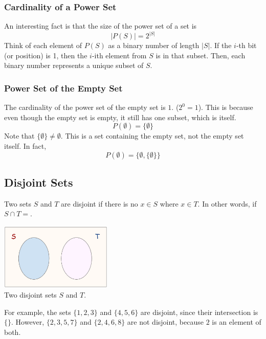\documentclass[10pt]{article}
\begin{document}
\subsubsection*{Cardinality of a Power Set}
An interesting fact is that the size of the power set of a set is
\[|P(S)| = 2^{|S|}\]
Think of each element of $P(S)$ as a binary number of length $|S|$.  If the $i$-th bit (or position) is 1, then the $i$-ith element from $S$ is in that subset.  Then, each binary number represents a unique subset of $S$.

\subsubsection*{Power Set of the Empty Set}
The cardinality of the power set of the empty set is $1$.  ($2^0 = 1$).  This is because even though the empty set is empty, it still has one subset, which is itself.
\[P(\emptyset) = \{\emptyset\}\]
Note that $\{\emptyset\} \neq \emptyset$.  This is a set containing the empty set, not the empty set itself.  In fact,
\[P({\emptyset}) = \{\emptyset, \{\emptyset\}\}\]

\subsection*{Disjoint Sets}
Two sets $S$ and $T$ are disjoint if there is no $x \in S$ where $x \in T$.  In other words, if $S \cap T = {}$.
\begin{center} 
	\includegraphics*[width=0.4\textwidth]{M2_3.png} \\
    Two disjoint sets $S$ and $T$.
\end{center}
For example, the sets $\{1, 2, 3\}$ and $\{4, 5, 6\}$ are disjoint, since their intersection is $\{\}$.  However, $\{2, 3, 5, 7\}$ and $\{2, 4, 6, 8\}$ are not disjoint, because $2$ is an element of both.
\end{document}
